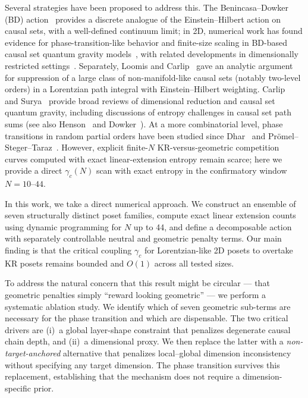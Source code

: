 \documentclass[11pt,a4paper]{article}
\begin{document}
Several strategies have been proposed to address this. The Benincasa--Dowker (BD) action~\cite{benincasa2010,benincasa2011} provides a discrete analogue of the Einstein--Hilbert action on causal sets, with a well-defined continuum limit; in 2D, numerical work has found evidence for phase-transition-like behavior and finite-size scaling in BD-based causal set quantum gravity models~\cite{surya2012,glaser2018}, with related developments in dimensionally restricted settings~\cite{cunningham2020}. Separately, Loomis and Carlip~\cite{loomis2018} gave an analytic argument for suppression of a large class of non-manifold-like causal sets (notably two-level orders) in a Lorentzian path integral with Einstein--Hilbert weighting. Carlip~\cite{carlip2017} and Surya~\cite{surya2019} provide broad reviews of dimensional reduction and causal set quantum gravity, including discussions of entropy challenges in causal set path sums (see also Henson~\cite{henson2006} and Dowker~\cite{dowker2005}). At a more combinatorial level, phase transitions in random partial orders have been studied since Dhar~\cite{dhar1978} and Pr{\"o}mel--Steger--Taraz~\cite{promel2001}. However, explicit finite-$N$ KR-versus-geometric competition curves computed with exact linear-extension entropy remain scarce; here we provide a direct $\gamma_c(N)$ scan with exact entropy in the confirmatory window $N=10$--$44$.

In this work, we take a direct numerical approach. We construct an ensemble of seven structurally distinct poset families, compute exact linear extension counts using dynamic programming for $N$ up to 44, and define a decomposable action with separately controllable neutral and geometric penalty terms. Our main finding is that the critical coupling $\gamma_c$ for Lorentzian-like 2D posets to overtake KR posets remains bounded and $O(1)$ across all tested sizes.

To address the natural concern that this result might be circular --- that geometric penalties simply ``reward looking geometric'' --- we perform a systematic ablation study. We identify which of seven geometric sub-terms are necessary for the phase transition and which are dispensable. The two critical drivers are (i)~a global layer-shape constraint that penalizes degenerate causal chain depth, and (ii)~a dimensional proxy. We then replace the latter with a \emph{non-target-anchored} alternative that penalizes local--global dimension inconsistency without specifying any target dimension. The phase transition survives this replacement, establishing that the mechanism does not require a dimension-specific prior.
\end{document}
